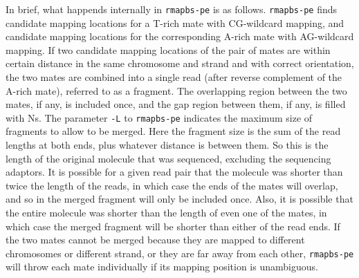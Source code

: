 \documentclass[10pt]{article}
\newcommand{\prog}[1]{\texttt{#1}}
\newcommand{\fn}[1]{\texttt{#1}}
\newcommand{\op}[1]{\texttt{#1}}
\begin{document}
In brief, what happends internally in \prog{rmapbs-pe} is as follows.
\prog{rmapbs-pe} finds candidate mapping locations for a T-rich mate
with CG-wildcard mapping, and candidate mapping locations for the
corresponding A-rich mate with AG-wildcard mapping. If two candidate
mapping locations of the pair of mates are within certain distance in
the same chromosome and strand and with correct orientation, the two
mates are combined into a single read (after reverse complement of the
A-rich mate), referred to as a fragment. The overlapping region
between the two mates, if any, is included once, and the gap region
between them, if any, is filled with Ns. The parameter \op{-L} to
\prog{rmapbs-pe} indicates the maximum size of fragments to allow to
be merged. Here the fragment size is the sum of the read lengths at
both ends, plus whatever distance is between them. So this is the
length of the original molecule that was sequenced, excluding the
sequencing adaptors. It is possible for a given read pair that the
molecule was shorter than twice the length of the reads, in which case
the ends of the mates will overlap, and so in the merged fragment will
only be included once. Also, it is possible that the entire molecule
was shorter than the length of even one of the mates, in which case
the merged fragment will be shorter than either of the read ends. If
the two mates cannot be merged because they are mapped to different
chromosomes or different strand, or they are far away from each other,
\prog{rmapbs-pe} will throw each mate individually if its mapping
position is unambiguous.


\end{document}
